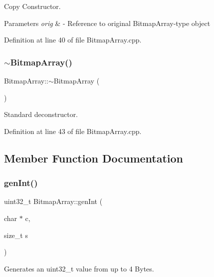 Copy Constructor. 


\begin{DoxyParams}{Parameters}
{\em orig} & -\/ Reference to original Bitmap\+Array-\/type object \\
\hline
\end{DoxyParams}


Definition at line 40 of file Bitmap\+Array.\+cpp.

\mbox{\label{classBitmapArray_acc21c3148de08fb85d2939821f9f2cf0}} 
\subsubsection{\texorpdfstring{$\sim$BitmapArray()}{~BitmapArray()}}
{\footnotesize\ttfamily Bitmap\+Array\+::$\sim$\+Bitmap\+Array (\begin{DoxyParamCaption}{ }\end{DoxyParamCaption})\hspace{0.3cm}{\ttfamily [virtual]}}

Standard deconstructor. 

Definition at line 43 of file Bitmap\+Array.\+cpp.



\subsection{Member Function Documentation}
\mbox{\label{classBitmapArray_a158fbbaa026332a732f644a8c368a2f0}} 
\subsubsection{\texorpdfstring{genInt()}{genInt()}}
{\footnotesize\ttfamily uint32\+\_\+t Bitmap\+Array\+::gen\+Int (\begin{DoxyParamCaption}\item[{char $\ast$}]{c,  }\item[{size\+\_\+t}]{s }\end{DoxyParamCaption})\hspace{0.3cm}{\ttfamily [private]}}



Generates an uint32\+\_\+t value from up to 4 Bytes. 


